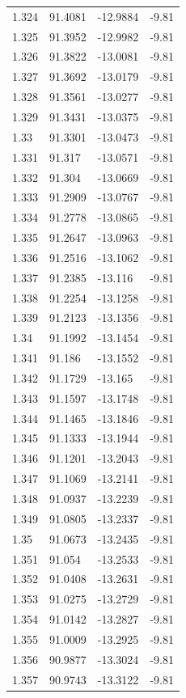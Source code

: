 \begin{tabular}{llll}
1.324 & 91.4081 & -12.9884 & -9.81 \\
1.325 & 91.3952 & -12.9982 & -9.81 \\
1.326 & 91.3822 & -13.0081 & -9.81 \\
1.327 & 91.3692 & -13.0179 & -9.81 \\
1.328 & 91.3561 & -13.0277 & -9.81 \\
1.329 & 91.3431 & -13.0375 & -9.81 \\
1.33 & 91.3301 & -13.0473 & -9.81 \\
1.331 & 91.317 & -13.0571 & -9.81 \\
1.332 & 91.304 & -13.0669 & -9.81 \\
1.333 & 91.2909 & -13.0767 & -9.81 \\
1.334 & 91.2778 & -13.0865 & -9.81 \\
1.335 & 91.2647 & -13.0963 & -9.81 \\
1.336 & 91.2516 & -13.1062 & -9.81 \\
1.337 & 91.2385 & -13.116 & -9.81 \\
1.338 & 91.2254 & -13.1258 & -9.81 \\
1.339 & 91.2123 & -13.1356 & -9.81 \\
1.34 & 91.1992 & -13.1454 & -9.81 \\
1.341 & 91.186 & -13.1552 & -9.81 \\
1.342 & 91.1729 & -13.165 & -9.81 \\
1.343 & 91.1597 & -13.1748 & -9.81 \\
1.344 & 91.1465 & -13.1846 & -9.81 \\
1.345 & 91.1333 & -13.1944 & -9.81 \\
1.346 & 91.1201 & -13.2043 & -9.81 \\
1.347 & 91.1069 & -13.2141 & -9.81 \\
1.348 & 91.0937 & -13.2239 & -9.81 \\
1.349 & 91.0805 & -13.2337 & -9.81 \\
1.35 & 91.0673 & -13.2435 & -9.81 \\
1.351 & 91.054 & -13.2533 & -9.81 \\
1.352 & 91.0408 & -13.2631 & -9.81 \\
1.353 & 91.0275 & -13.2729 & -9.81 \\
1.354 & 91.0142 & -13.2827 & -9.81 \\
1.355 & 91.0009 & -13.2925 & -9.81 \\
1.356 & 90.9877 & -13.3024 & -9.81 \\
1.357 & 90.9743 & -13.3122 & -9.81 \\

\end{tabular}
